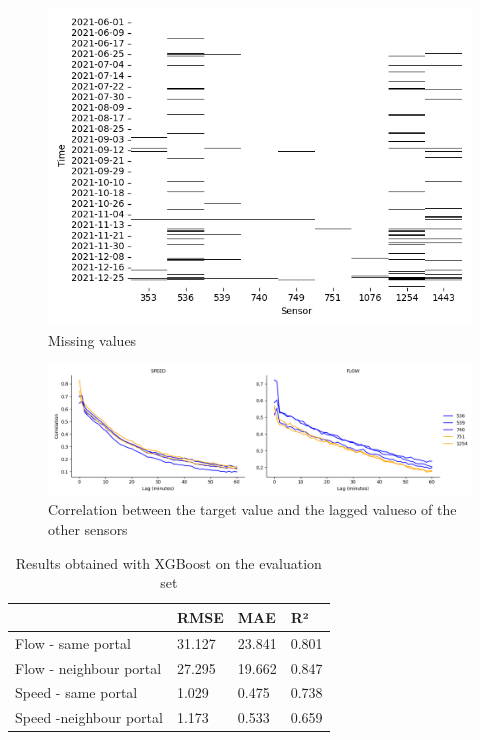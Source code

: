	\begin{figure}[H]
		\centering
		\includegraphics[width =0.5 \linewidth]{../Plots/missingvalues}
		\caption{Missing values}
		\label{fig:missingvalues}
	\end{figure}
	\begin{figure}[H]
		\centering
		\includegraphics[width =0.99 \linewidth]{../Plots/Correlation_lag_flow_speed_peak}
		\caption{Correlation between the target value and the lagged valueso of the other sensors}
		\label{fig:correlation_lag}
	\end{figure}
	\begin{table}[H]
		\centering
		\caption{Results obtained with XGBoost on the evaluation set}
		\label{tab:result_xgb_evaluation}
		\begin{tabular}{l|lll}
			& RMSE   & MAE    & R²    \\
			\hline
			Flow - same portal      &31.127 & 23.841 & 0.801\\
			Flow - neighbour portal &  27.295 &19.662 &0.847\\
			Speed - same portal     &1.029 & 0.475& 0.738\\
			Speed -neighbour portal & 1.173 & 0.533 & 0.659
		\end{tabular}
	\end{table}
